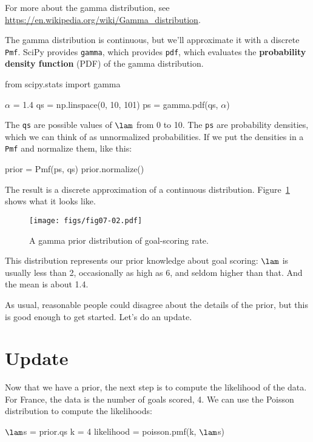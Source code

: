 \documentclass[12pt]{book}
\theoremstyle{exercise}
\newcommand{\py}[1]{{\tt #1}}%
\begin{document}
For more about the gamma distribution, see \url{https://en.wikipedia.org/wiki/Gamma_distribution}.

The gamma distribution is continuous, but we'll approximate it with a discrete \py{Pmf}.
SciPy provides \py{gamma}, which provides \py{pdf}, which evaluates the {\bf probability density function} (PDF) of the gamma distribution.

\newcommand{\alf}{\mathtt{\alpha}}

\begin{code}
from scipy.stats import gamma

$\alf$ = 1.4
qs = np.linspace(0, 10, 101)
ps = gamma.pdf(qs, $\alf$)
\end{code}

The \py{qs} are possible values of $\lam$ from 0 to 10.
The \py{ps} are probability densities, which we can think of as unnormalized probabilities.
If we put the densities in a \py{Pmf} and normalize them, like this:

\begin{code}
prior = Pmf(ps, qs)
prior.normalize()
\end{code}

The result is a discrete approximation of a continuous distribution.
Figure~\ref{fig07-02} shows what it looks like.

\begin{figure}
\centerline{\texttt{[image: figs/fig07-02.pdf]}}
\caption{A gamma prior distribution of goal-scoring rate.}
\label{fig07-02}
\end{figure}

This distribution represents our prior knowledge about goal scoring: $\lam$ is usually less than 2, occasionally as high as 6, and seldom higher than that.  And the mean is about 1.4.

As usual, reasonable people could disagree about the details of the prior, but this is good enough to get started.
Let's do an update.



\section{Update}

Now that we have a prior, the next step is to compute the likelihood of the data.
For France, the data is the number of goals scored, 4.
We can use the Poisson distribution to compute the likelihoods:

\begin{code}
$\lam$s = prior.qs
k = 4
likelihood = poisson.pmf(k, $\lam$s)
\end{code}
\end{document}
